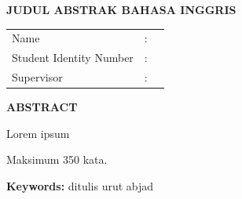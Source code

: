 
\newpage
\thispagestyle{plain}

\begin{center}
    {\fontsize{14}{16}\selectfont\bfseries JUDUL ABSTRAK BAHASA INGGRIS}
\end{center}

\vspace{0.8cm}

\noindent
\begin{tabular}{@{}p{4.5cm}@{}p{0.3cm}@{}p{9cm}@{}}
    Name & : & \\
    Student Identity Number & : & \\
    Supervisor & : & \\
\end{tabular}

\vspace{1cm}

\begin{center}
    {\fontsize{12}{14}\selectfont\bfseries ABSTRACT}
\end{center}

\vspace{0.5cm}


\noindent
\hspace{1.5cm}Lorem ipsum

\hspace{1.5cm}Maksimum 350 kata.

\vspace{0.5cm}

\noindent
\textbf{Keywords:} ditulis urut abjad